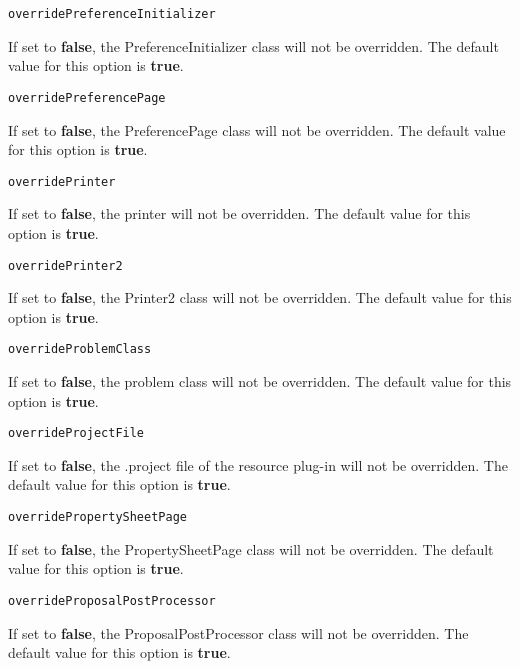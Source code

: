 \noindent\texttt{overridePreferenceInitializer}
\begin{myindentpar}{1cm}
If set to \textbf{false}, the PreferenceInitializer class will not be overridden. The default value for this option is \textbf{true}.
\end{myindentpar}

\noindent\texttt{overridePreferencePage}
\begin{myindentpar}{1cm}
If set to \textbf{false}, the PreferencePage class will not be overridden. The default value for this option is \textbf{true}.
\end{myindentpar}

\noindent\texttt{overridePrinter}
\begin{myindentpar}{1cm}
If set to \textbf{false}, the printer will not be overridden. The default value for this option is \textbf{true}.
\end{myindentpar}

\noindent\texttt{overridePrinter2}
\begin{myindentpar}{1cm}
If set to \textbf{false}, the Printer2 class will not be overridden. The default value for this option is \textbf{true}.
\end{myindentpar}

\noindent\texttt{overrideProblemClass}
\begin{myindentpar}{1cm}
If set to \textbf{false}, the problem class will not be overridden. The default value for this option is \textbf{true}.
\end{myindentpar}

\noindent\texttt{overrideProjectFile}
\begin{myindentpar}{1cm}
If set to \textbf{false}, the .project file of the resource plug-in will not be overridden. The default value for this option is \textbf{true}.
\end{myindentpar}

\noindent\texttt{overridePropertySheetPage}
\begin{myindentpar}{1cm}
If set to \textbf{false}, the PropertySheetPage class will not be overridden. The default value for this option is \textbf{true}.
\end{myindentpar}

\noindent\texttt{overrideProposalPostProcessor}
\begin{myindentpar}{1cm}
If set to \textbf{false}, the ProposalPostProcessor class will not be overridden. The default value for this option is \textbf{true}.
\end{myindentpar}

